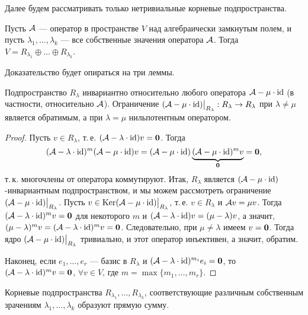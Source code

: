 Далее будем рассматривать только нетривиальные корневые подпространства.

\begin{theorem}
    Пусть $\mathcal{A}$ --- оператор в пространстве $V$ над алгебраически замкнутым полем, и пусть $\lambda_1, \ldots, \lambda_k$ --- все собственные значения оператора $\mathcal{A}$. Тогда $V = R_{\lambda_1} \oplus \ldots \oplus R_{\lambda_k}$.
\end{theorem}

Доказательство будет опираться на три леммы.

\begin{lemma}
    Подпространство $R_\lambda$ инвариантно относительно любого оператора $\mathcal{A} - \mu \cdot \mathrm{id}$ (в частности, относительно $\mathcal{A}$). Ограничение $(\mathcal{A} - \mu \cdot \mathrm{id})\big|_{R_\lambda}: R_\lambda \to R_\lambda$ при $\lambda \ne \mu$ является обратимым, а при $\lambda = \mu$ нильпотентным оператором.
\end{lemma}

\begin{proof}
    Пусть $v \in R_\lambda$, т.\,е. $(\mathcal{A} - \lambda \cdot \mathrm{id})v = \boldsymbol{0}$. Тогда
    \[
        (\mathcal{A} - \lambda \cdot \mathrm{id})^m(\mathcal{A} - \mu \cdot \mathrm{id})v = (\mathcal{A} - \mu \cdot \mathrm{id})\underbrace{(\mathcal{A} - \mu \cdot \mathrm{id})^mv}_{\boldsymbol{0}} = \boldsymbol{0},
    \]
    т.\,к. многочлены от оператора коммутируют. Итак, $R_\lambda$ является $(\mathcal{A} - \mu \cdot \mathrm{id})$-инвариантным подпространством, и мы можем рассмотреть ограничение $(\mathcal{A} - \mu \cdot \mathrm{id})\big|_{R_\lambda}$. Пусть $v \in \operatorname{Ker}(\mathcal{A} - \mu \cdot \mathrm{id})\big|_{R_\lambda}$, т.\,е. $v \in R_\lambda$ и $\mathcal{A} v = \mu v$. Тогда $(\mathcal{A} - \lambda \cdot \mathrm{id})^mv = \boldsymbol{0}$ для некоторого $m$ и $(\mathcal{A} - \lambda \cdot \mathrm{id})v = (\mu - \lambda)v$, а значит, $(\mu - \lambda)^mv = (\mathcal{A} - \lambda \cdot \mathrm{id})^mv = \boldsymbol{0}$. Следовательно, при $\mu \ne \lambda$ имеем $v = \boldsymbol{0}$. Тогда ядро $(\mathcal{A} - \mu \cdot \mathrm{id})\big|_{R_\lambda}$ тривиально, и этот оператор инъективен, а значит, обратим.

    Наконец, если $e_1, \ldots, e_r$ --- базис в $R_\lambda$ и $(\mathcal{A} - \lambda \cdot \mathrm{id})^{m_i}e_i = \boldsymbol{0}$, то $(\mathcal{A} - \lambda \cdot \mathrm{id})^mv = \boldsymbol{0}$, $\forall v \in V$, где $m = \max\{m_1, \ldots, m_r\}$.
\end{proof}

\begin{lemma}
    Корневые подпространства $R_{\lambda_1}, \ldots, R_{\lambda_k}$, соответствующие различным собственным зрачениям $\lambda_1, \ldots, \lambda_k$ образуют прямую сумму.
\end{lemma}

